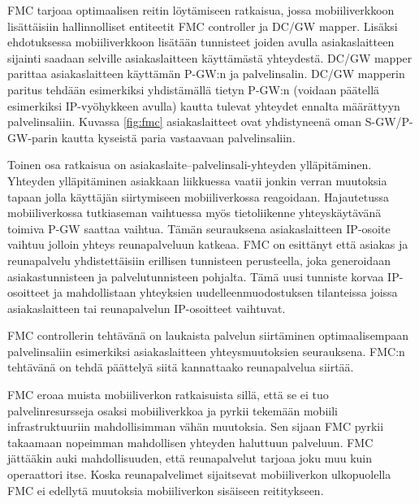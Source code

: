 FMC tarjoaa optimaalisen reitin löytämiseen ratkaisua, jossa mobiiliverkkoon lisättäisiin hallinnolliset entiteetit FMC controller ja DC/GW mapper.
Lisäksi ehdotuksessa mobiiliverkkoon lisätään tunnisteet joiden avulla asiakaslaitteen sijainti saadaan selville asiakaslaitteen käyttämästä yhteydestä.
DC/GW mapper parittaa asiakaslaitteen käyttämän P-GW:n ja palvelinsalin.
DC/GW mapperin paritus tehdään esimerkiksi yhdistämällä tietyn P-GW:n (voidaan päätellä esimerkiksi IP-vyöhykkeen avulla) kautta tulevat yhteydet ennalta määrättyyn palvelinsaliin. 
Kuvassa \ref{fig:fmc} asiakaslaitteet ovat yhdistyneenä oman S-GW/P-GW-parin kautta kyseistä paria vastaavaan palvelinsaliin. 

Toinen osa ratkaisua on asiakaslaite–palvelinsali-yhteyden ylläpitäminen.
Yhteyden ylläpitäminen asiakkaan liikkuessa vaatii jonkin verran muutoksia tapaan jolla käyttäjän siirtymiseen mobiiliverkossa reagoidaan. 
Hajautetussa mobiiliverkossa tutkiaseman vaihtuessa myös tietoliikenne yhteyskäytävänä toimiva P-GW saattaa vaihtua. Tämän seurauksena asiakaslaitteen IP-osoite vaihtuu jolloin yhteys reunapalveluun katkeaa.
FMC on esittänyt että asiakas ja reunapalvelu yhdistettäisiin erillisen tunnisteen perusteella, joka generoidaan asiakastunnisteen ja palvelutunnisteen pohjalta.
Tämä uusi tunniste korvaa IP-osoitteet ja mahdollistaan yhteyksien uudelleenmuodostuksen tilanteissa joissa asiakaslaitteen tai reunapalvelun IP-osoitteet vaihtuvat.

FMC controllerin tehtävänä on laukaista palvelun siirtäminen optimaalisempaan palvelinsaliin esimerkiksi asiakaslaitteen yhteysmuutoksien seurauksena.
FMC:n tehtävänä on tehdä päättelyä siitä kannattaako reunapalvelua siirtää.

FMC eroaa muista mobiiliverkon ratkaisuista sillä, että se ei tuo palvelinresursseja osaksi mobiiliverkkoa ja pyrkii tekemään mobiili infrastruktuuriin mahdollisimman vähän muutoksia. Sen sijaan FMC pyrkii takaamaan nopeimman mahdollisen yhteyden haluttuun palveluun. FMC jättääkin auki mahdollisuuden, että reunapalvelut tarjoaa joku muu kuin operaattori itse.
Koska reunapalvelimet sijaitsevat mobiiliverkon ulkopuolella FMC ei edellytä muutoksia mobiiliverkon sisäiseen reititykseen.
